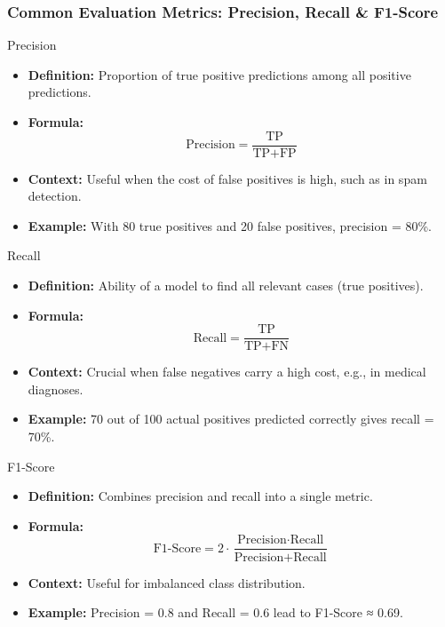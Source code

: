 \documentclass[aspectratio=169]{beamer}
\begin{document}
\begin{frame}[fragile]
    \frametitle{Common Evaluation Metrics: Precision, Recall \& F1-Score}
    \begin{block}{Precision}
        \begin{itemize}
            \item \textbf{Definition:} Proportion of true positive predictions among all positive predictions.
            \item \textbf{Formula:}
            \begin{equation}
                \text{Precision} = \frac{\text{TP}}{\text{TP} + \text{FP}}
            \end{equation}
            \item \textbf{Context:} Useful when the cost of false positives is high, such as in spam detection.
            \item \textbf{Example:} With 80 true positives and 20 false positives, precision = 80\%.
        \end{itemize}
    \end{block}

    \begin{block}{Recall}
        \begin{itemize}
            \item \textbf{Definition:} Ability of a model to find all relevant cases (true positives).
            \item \textbf{Formula:}
            \begin{equation}
                \text{Recall} = \frac{\text{TP}}{\text{TP} + \text{FN}}
            \end{equation}
            \item \textbf{Context:} Crucial when false negatives carry a high cost, e.g., in medical diagnoses.
            \item \textbf{Example:} 70 out of 100 actual positives predicted correctly gives recall = 70\%.
        \end{itemize}
    \end{block}

    \begin{block}{F1-Score}
        \begin{itemize}
            \item \textbf{Definition:} Combines precision and recall into a single metric.
            \item \textbf{Formula:}
            \begin{equation}
                \text{F1-Score} = 2 \cdot \frac{\text{Precision} \cdot \text{Recall}}{\text{Precision} + \text{Recall}}
            \end{equation}
            \item \textbf{Context:} Useful for imbalanced class distribution.
            \item \textbf{Example:} Precision = 0.8 and Recall = 0.6 lead to F1-Score ≈ 0.69.
        \end{itemize}
    \end{block}
\end{frame}
\end{document}
